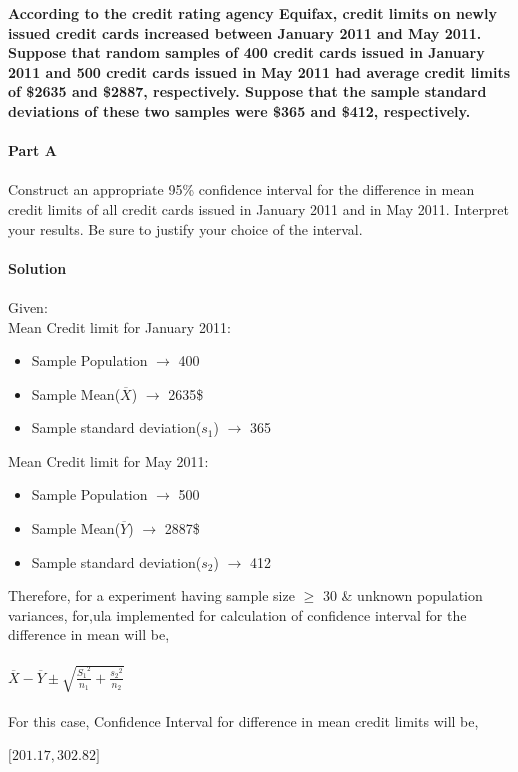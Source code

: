 \documentclass[12pt,a4paper]{report}
\begin{document}
\textbf{According to the credit rating agency Equifax, credit limits on newly issued credit cards increased between January 2011 and May 2011. Suppose that random samples of 400 credit cards issued in January
2011 and 500 credit cards issued in May 2011 had average credit limits of \$2635 and \$2887, respectively. Suppose that the sample standard deviations of these two samples were \$365 and \$412, respectively.}
\\\\
\textbf{Part A}
\\\\
Construct an appropriate 95\% confidence interval for the difference in mean credit limits of all credit cards issued in January 2011 and in May 2011. Interpret your results. Be sure to justify your choice of the
interval.
\\\\
\textbf{Solution}
\\\\
Given:\\
Mean Credit limit for January 2011:\\
\begin{itemize}
\item Sample Population $\rightarrow$ 400
\item Sample Mean($\overline{X}$) $\rightarrow$ 2635\$
\item Sample standard deviation($s_1$) $\rightarrow$ 365
\end{itemize}

Mean Credit limit for May 2011:\\
\begin{itemize}
\item Sample Population $\rightarrow$ 500
\item Sample Mean($\overline{Y}$) $\rightarrow$ 2887\$
\item Sample standard deviation($s_2$) $\rightarrow$ 412
\end{itemize}
Therefore, for a experiment having sample size $\geq$ 30 \& unknown population variances, for,ula implemented for calculation of confidence interval for the difference in mean will be,\\\\
$\overline{X}-\overline{Y} \pm \sqrt{\frac{{S_1}^2}{n_1} + \frac{{s_2}^2}{n_2}}$
\\\\
For this case, Confidence Interval for difference in mean credit limits will be,
\begin{center}
$\lbrack 201.17,302.82 \rbrack$
\end{center}
\end{document}
